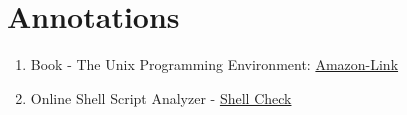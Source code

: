 \documentclass{dcbl/challenge}
\begin{document}
\section*{Annotations}
\begin{enumerate}
    \item Book - The Unix Programming Environment: \href{https://www.amazon.com/-/de/dp/013937681X/ref=sr_1_1?crid=ZKV5OYC7B2XL&dib=eyJ2IjoiMSJ9.v5CMlrbXxKNhJIQ9iZvGeMZy7oFDdqBAnw6zl2-EzGCqPGxoH4dg4ufJ-uftq4__sS0dCnpEB3K6Ww_pbnsU57rcy8_4TXWXlW46DnHlNz3fRD7c1IKeLKYl93tlUhbze1Ll_8DWYLieGNRjMVBKfgPas9NEc79Q4YjI42-E7COCtA0TdsFaelwsNb-URkEx7sGlIM5XiiyM5YNLV4c90m2HcTzFKltwxrYPxnpVXhw.mRUMSZNTrIguh4aCuI0kzn2jBvh6KKybz4atkIP2hxw&dib_tag=se&keywords=unix+programming+environment&qid=1711993814&sprefix=unix+programmi\%2Caps\%2C313&sr=8-1}{Amazon-Link}
    \item Online Shell Script Analyzer - \href{https://shellcheck.net}{Shell Check}
\end{enumerate}
\end{document}
